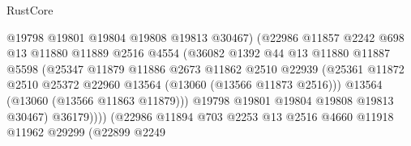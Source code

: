 \begin{lexlean}{RustCore}
\begin{coremodule}
                                      @19798
                                      @19801
                                      @19804
                                      @19808
                                      @19813
                                      @30467)
                                    (@22986
                                      @11857
                                      @2242
                                      @698
                                      @13
                                      @11880
                                      @11889
                                      @2516
                                      @4554
                                      (@36082
                                        @1392
                                        @44
                                        @13
                                        @11880
                                        @11887
                                        @5598
                                        (@25347
                                          @11879
                                          @11886
                                          @2673
                                          @11862
                                          @2510
                                          @22939
                                          (@25361
                                            @11872
                                            @2510
                                            @25372
                                            @22960
                                            @13564
                                            (@13060 (@13566 @11873 @2516)))
                                          @13564
                                          (@13060 (@13566 @11863 @11879)))
                                        @19798
                                        @19801
                                        @19804
                                        @19808
                                        @19813
                                        @30467)
                                      @36179))))
                              (@22986
                                @11894
                                @703
                                @2253
                                @13
                                @2516
                                @4660
                                @11918
                                @11962
                                @29299
                                (@22899
                                  @2249

\end{coremodule}
\end{lexlean}

